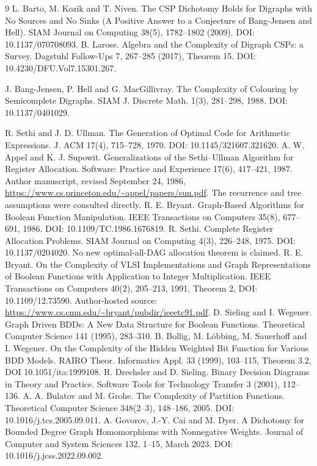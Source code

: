 \documentclass[11pt]{article}
\begin{document}
\begin{thebibliography}{9}
L. Barto, M. Kozik and T. Niven.
The CSP Dichotomy Holds for Digraphs with No Sources and No Sinks
(A Positive Answer to a Conjecture of Bang-Jensen and Hell).
SIAM Journal on Computing 38(5), 1782--1802 (2009).
DOI: 10.1137/070708093.
B. Larose. Algebra and the Complexity of Digraph CSPs: a Survey.
Dagstuhl Follow-Ups 7, 267--285 (2017), Theorem 15.
DOI: 10.4230/DFU.Vol7.15301.267.

 J. Bang-Jensen, P. Hell and G. MacGillivray.
The Complexity of Colouring by Semicomplete Digraphs.
SIAM J. Discrete Math. 1(3), 281--298, 1988.
DOI: 10.1137/0401029.

 R. Sethi and J. D. Ullman. The Generation of Optimal Code for Arithmetic Expressions. J. ACM 17(4), 715--728, 1970. DOI: 10.1145/321607.321620.
 A. W. Appel and K. J. Supowit. Generalizations of the Sethi--Ullman Algorithm for Register Allocation. Software: Practice and Experience 17(6), 417--421, 1987. Author manuscript, revised September 24, 1986, \url{https://www.cs.princeton.edu/~appel/papers/sun.pdf}. The recurrence and tree assumptions were consulted directly.
 R. E. Bryant. Graph-Based Algorithms for Boolean Function Manipulation. IEEE Transactions on Computers 35(8), 677--691, 1986. DOI: 10.1109/TC.1986.1676819.
 R. Sethi. Complete Register Allocation Problems. SIAM Journal on Computing 4(3), 226--248, 1975. DOI: 10.1137/0204020. No new optimal-all-DAG allocation theorem is claimed.
 R. E. Bryant.
On the Complexity of VLSI Implementations and Graph Representations of
Boolean Functions with Application to Integer Multiplication.
IEEE Transactions on Computers 40(2), 205--213, 1991,
Theorem 2, DOI: 10.1109/12.73590.
Author-hosted source: \url{https://www.cs.cmu.edu/~bryant/pubdir/ieeetc91.pdf}.
 D. Sieling and I. Wegener. Graph Driven BDDs:
A New Data Structure for Boolean Functions.
Theoretical Computer Science 141 (1995), 283--310.
 B. Bollig, M. L\"obbing, M. Sauerhoff and
I. Wegener. On the Complexity of the Hidden Weighted Bit Function
for Various BDD Models. RAIRO Theor. Informatics Appl. 33
(1999), 103--115, Theorem 3.2, DOI 10.1051/ita:1999108.
 R. Drechsler and D. Sieling.
Binary Decision Diagrams in Theory and Practice.
Software Tools for Technology Transfer 3 (2001), 112--136.
A. A. Bulatov and M. Grohe. The Complexity of Partition Functions.
Theoretical Computer Science 348(2--3), 148--186, 2005.
DOI: 10.1016/j.tcs.2005.09.011.
A. Govorov, J.-Y. Cai and M. Dyer.
A Dichotomy for Bounded Degree Graph Homomorphisms with Nonnegative Weights.
Journal of Computer and System Sciences 132, 1--15, March 2023.
DOI: 10.1016/j.jcss.2022.09.002.


\end{thebibliography}
\end{document}
